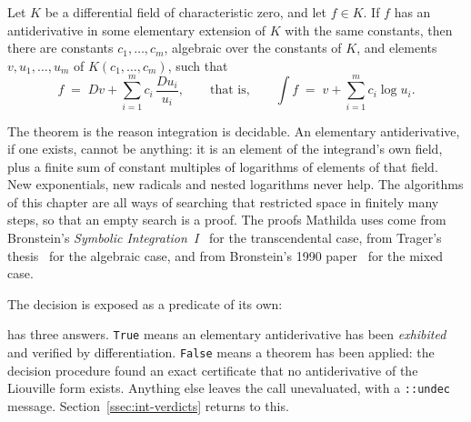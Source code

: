 \begin{theorem}
\label{thm:liouville}
Let \(K\) be a differential field of characteristic zero, and let \(f\in K\). If
\(f\) has an antiderivative in some elementary extension of \(K\) with the same
constants, then there are constants \(c_1,\dots,c_m\), algebraic over the constants of
\(K\), and elements \(v, u_1,\dots,u_m\) of \(K(c_1,\dots,c_m)\), such that
\[
  f \;=\; Dv + \sum_{i=1}^{m} c_i\,\frac{Du_i}{u_i},
  \qquad\text{that is,}\qquad
  \int f \;=\; v + \sum_{i=1}^{m} c_i \log u_i .
\]
\end{theorem}

The theorem is the reason integration is decidable. An elementary antiderivative,
if one exists, cannot be anything: it is an element of the integrand's own field,
plus a finite sum of constant multiples of logarithms of elements of that field.
New exponentials, new radicals and nested logarithms never help. The algorithms of
this chapter are all ways of searching that restricted space in finitely many
steps, so that an empty search is a proof. The proofs Mathilda uses come from
Bronstein's \emph{Symbolic Integration~I}~\cite{bronstein2005} for the
transcendental case, from Trager's thesis~\cite{trager1984} for the algebraic
case, and from Bronstein's 1990 paper~\cite{bronstein1990} for the mixed case.

The decision is exposed as a predicate of its own:

\begin{codepairs}
\end{codepairs}

 has three answers.
\texttt{True} means an elementary antiderivative has been \emph{exhibited} and
verified by differentiation. \texttt{False} means a theorem has been applied: the
decision procedure found an exact certificate that no antiderivative of the
Liouville form exists. Anything else leaves the call unevaluated, with a
\texttt{::undec} message. Section~\ref{ssec:int-verdicts} returns to this.

